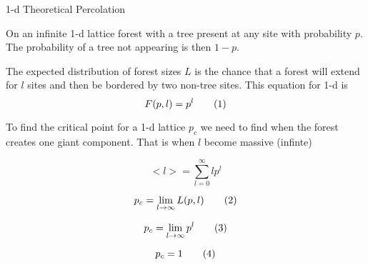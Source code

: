 1-d Theoretical Percolation

On an infinite 1-d lattice forest with a tree present at any site with probability $p$. The probability of a tree not appearing is then $1 - p$. 

The expected distribution of forest sizes $L$ is the chance that a forest will extend for $l$ sites and then be bordered by two non-tree sites. This equation for 1-d is
\[
  F(p, l)
  =
    p^l
  \addtag
\]

To find the critical point for a 1-d lattice $p_c$ we need to find when the forest creates one giant component. That is when $l$ become massive (infinte)

\[
  <l> = 
    \sum_{l=0}^{\infty}
    l p^l
\]

\[
  p_c = 
    \lim_{l \to \infty} L(p,l)
  \addtag
\]

\[
  p_c = 
    \lim_{l \to \infty} p^l 
  \addtag
\]

\[
  p_c = 1
  \addtag
\]
